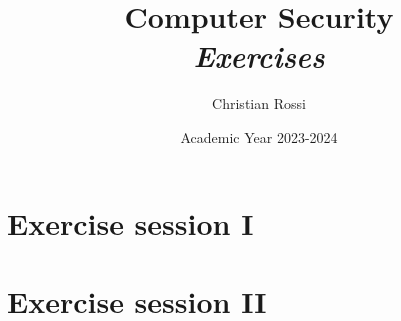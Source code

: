 \documentclass[12pt, a4paper]{report}
\title{Computer Security \\ \textit{Exercises}}
\author{Christian Rossi}
\date{Academic Year 2023-2024}
\begin{document}
    \maketitle

    

    \cleardoublepage

    \tableofcontents

    \cleardoublepage

    \chapter{Exercise session I}
    
    
    
    
    

    \chapter{Exercise session II}
    
    
\end{document}

